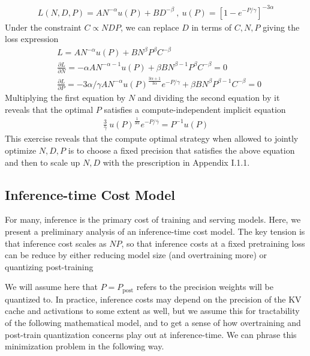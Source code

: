 \documentclass[11pt]{article}
\begin{document}
\begin{align}
    L(N, D, P) = A N^{-\alpha} u(P) + B D^{-\beta} \ , \ u(P) = [1-e^{-P/\gamma}]^{-3\alpha} 
\end{align}
Under the constraint $C \propto NDP$, we can replace $D$ in terms of $C, N, P$ giving the loss expression
\begin{align}
    &L = A N^{-\alpha} u(P) + B N^{ \beta} P^\beta C^{-\beta}
    \\
    &\frac{\partial L}{\partial N} = - \alpha A N^{-\alpha - 1} u(P) + \beta  B N^{\beta - 1} P^\beta C^{-\beta} = 0 
    \\
    &\frac{\partial L}{\partial P} = - 3  \alpha / \gamma A  N^{-\alpha } u(P)^{\frac{3\alpha+1}{3\alpha}} e^{- P/\gamma} + \beta B N^\beta P^{\beta-1} C^{-\beta} = 0 
\end{align}
Multiplying the first equation by $N$ and dividing the second equation by it reveals that the optimal $P$ satisfies a compute-independent implicit equation
\begin{align}
    \frac{3 }{\bar{\gamma}}\ u(P)^{\frac{1}{3\alpha}} e^{- P/\bar{\gamma}} = P^{-1 } u(P)
\end{align}
This exercise reveals that the compute optimal strategy when allowed to jointly optimize $N,D,P$ is to choose a fixed precision that satisfies the above equation and then to scale up $N,D$ with the prescription in Appendix I.1.1. 

\subsection{Inference-time Cost Model}\label{appdx:inf-cost}

For many, inference is the primary cost of training and serving models. Here, we present a preliminary analysis of an inference-time cost model. The key tension is that inference cost scales as $NP$, so that inference costs at a fixed pretraining loss can be reduce by either reducing model size (and overtraining more) or quantizing post-training

We will assume here that $P=P_\text{post}$ refers to the precision weights will be quantized to. In practice, inference costs may depend on the precision of the KV cache and activations to some extent as well, but we assume this for tractability of the following mathematical model, and to get a sense of how overtraining and post-train quantization concerns play out at inference-time. We can phrase this minimization problem in the following way. 
\end{document}
